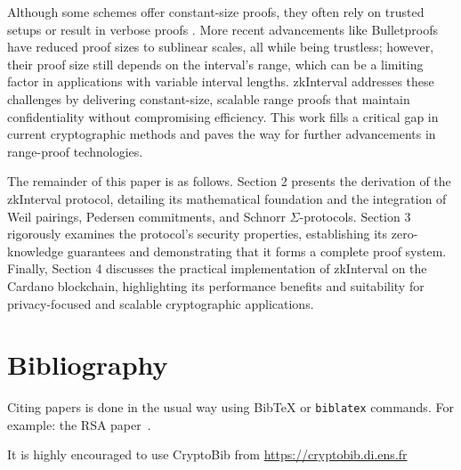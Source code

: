 \documentclass{iacrcc}
\begin{document}
Although some schemes offer constant-size proofs, they often rely on trusted setups or result in verbose proofs \cite{cryptoeprint:2024/430}. More recent advancements like Bulletproofs \cite{bunz2018bulletproofs} have reduced proof sizes to sublinear scales, all while being trustless; however, their proof size still depends on the interval's range, which can be a limiting factor in applications with variable interval lengths. zkInterval addresses these challenges by delivering constant-size, scalable range proofs that maintain confidentiality without compromising efficiency. This work fills a critical gap in current cryptographic methods and paves the way for further advancements in range-proof technologies.

The remainder of this paper is as follows. Section 2 presents the derivation of the zkInterval protocol, detailing its mathematical foundation and the integration of Weil pairings, Pedersen commitments, and Schnorr $\Sigma$-protocols. Section 3 rigorously examines the protocol's security properties, establishing its zero-knowledge guarantees and demonstrating that it forms a complete proof system. Finally, Section 4 discusses the practical implementation of zkInterval on the Cardano blockchain, highlighting its performance benefits and suitability for privacy-focused and scalable cryptographic applications.

\section{Bibliography}
Citing papers is done in the usual way using BibTeX or \texttt{biblatex}
commands. For example: the RSA paper~\cite{RSA78}.

It is highly encouraged to use CryptoBib from \url{https://cryptobib.di.ens.fr}



\end{document}
